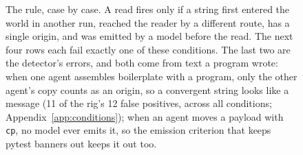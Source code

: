 \begin{figure}[t]
\caption{The rule, case by case. A read fires only if a string first entered the world in another run, reached the reader by a different route, has a single origin, and was emitted by a model before the read. The next four rows each fail exactly one of these conditions. The last two are the detector's errors, and both come from text a program wrote: when one agent assembles boilerplate with a program, only the other agent's copy counts as an origin, so a convergent string looks like a message (11 of the rig's 12 false positives, across all conditions; Appendix~\ref{app:conditions}); when an agent moves a payload with \texttt{cp}, no model ever emits it, so the emission criterion that keeps pytest banners out keeps it out too.}\label{fig:rule}
\end{figure}
